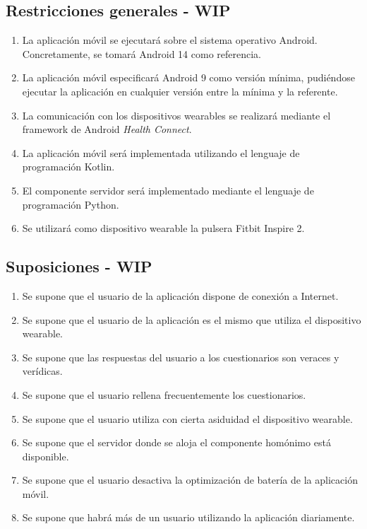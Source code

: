         
    \subsection{Restricciones generales - WIP}
        \label{req:descripcion:restricciones}
        \begin{enumerate}[label=\textbf{RG-\arabic*}]
            \item \label{req:restriccion:android_referencia} La aplicación móvil se ejecutará sobre el sistema operativo Android. Concretamente, se tomará Android 14 como referencia.
            \item \label{req:restriccion:android_minimo} La aplicación móvil especificará Android 9 como versión mínima, pudiéndose ejecutar la aplicación en cualquier versión entre la mínima y la referente.
            \item La comunicación con los dispositivos \glspl{wearable} se realizará mediante el \gls{framework} de Android \textit{Health Connect}.
            \item La aplicación móvil será implementada utilizando el lenguaje de programación Kotlin.
            \item El componente servidor será implementado mediante el lenguaje de programación Python.
            \item Se utilizará como dispositivo \gls{wearable} la pulsera Fitbit Inspire 2.
        \end{enumerate}
    
    \subsection{Suposiciones - WIP}
        \label{req:descripcion:suposiciones}

        \begin{enumerate}[label=\textbf{SUP-\arabic*}]
            \item Se supone que el usuario de la aplicación dispone de conexión a Internet.
            \item Se supone que el usuario de la aplicación es el mismo que utiliza el dispositivo \gls{wearable}.
            \item Se supone que las respuestas del usuario a los cuestionarios son veraces y verídicas.
            \item Se supone que el usuario rellena frecuentemente los cuestionarios.
            \item Se supone que el usuario utiliza con cierta asiduidad el dispositivo \gls{wearable}.
            \item Se supone que el servidor donde se aloja el componente homónimo está disponible.
            \item Se supone que el usuario desactiva la optimización de batería de la aplicación móvil.
            \item Se supone que habrá más de un usuario utilizando la aplicación diariamente.
        \end{enumerate}
        

